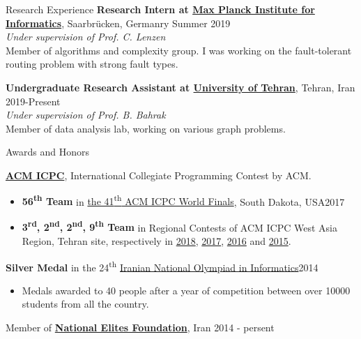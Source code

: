 \documentclass{resume} %
\begin{document}

\begin{rSection}{Research Experience}
{\bf Research Intern at \href{https://www.mpi-inf.mpg.de/}{Max Planck Institute for Informatics}}, {\small Saarbr{\"u}cken, Germanry \hfill Summer 2019}
\\\textit{Under supervision of Prof. C. Lenzen}
	\\Member of algorithms and complexity group. I was working on the fault-tolerant routing problem with strong fault types.

{\bf Undergraduate Research Assistant at \href{http://ut.ac.ir/en}{University of Tehran}}, Tehran, Iran \hfill{2019-Present}
\\\textit{Under supervision of Prof. B. Bahrak}
	\\Member of data analysis lab, working on various graph problems.

\end{rSection}


\begin{rSection}{Awards and Honors}
	
	{\bf \href{http://icpc.baylor.edu/}{ACM ICPC}}, International Collegiate Programming Contest by ACM.
	\begin{itemize}
		\item {\bf 56\textsuperscript{th} Team} in
		\href{https://icpc.baylor.edu/community/results-2017}{the 41\textsuperscript{th} ACM ICPC World Finals},
		South Dakota, USA\hfill 2017
		
		\item {\bf 3\textsuperscript{rd}, 2\textsuperscript{nd}, 2\textsuperscript{nd}, 9\textsuperscript{th} Team} in Regional Contests of ACM ICPC West Asia Region,
		Tehran site, respectively in
		\href{http://icpc.sharif.edu/acmicpc18/scoreboard/}{2018},
		\href{http://icpc.sharif.edu/acmicpc17/scoreboard/}{2017},
		\href{http://icpc.sharif.edu/acmicpc16/scoreboard/}{2016} and
		\href{http://icpc.sharif.edu/acmicpc15/scoreboard/}{2015}.
	\end{itemize}
	
	{\bf Silver Medal} in the 24\textsuperscript{th} \href{http://inoi.ir/}{Iranian National Olympiad in Informatics}\hfill 2014
	\begin{itemize}
		\item[] Medals awarded to 40 people after a year of competition between over 10000 students from all the country.
	\end{itemize}
	
	Member of \href{https://www.bmn.ir/}{{\bf National Elites Foundation}}, Iran \hfill 2014 - persent
	
\end{rSection}
\end{document}
